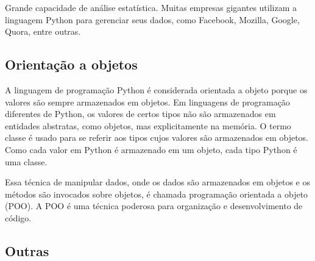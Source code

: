         Grande capacidade de análise estatística. Muitas empresas gigantes utilizam a linguagem Python para gerenciar seus dados, como Facebook, Mozilla, Google, Quora, entre outras. 

        \subsection{Orientação a objetos}
        A linguagem de programação Python é considerada orientada a objeto porque os valores são
        sempre armazenados em objetos. Em linguagens de programação diferentes de Python, os valores
        de certos tipos não são armazenados em entidades abstratas, como objetos, mas explicitamente na
        memória. O termo classe é usado para se referir aos tipos cujos valores são armazenados em
        objetos. Como cada valor em Python é armazenado em um objeto, cada tipo Python é uma classe. 
        
        Essa técnica de manipular dados, onde os dados são armazenados em objetos e os métodos são invocados sobre objetos, é chamada programação
        orientada a objeto (POO). A POO é uma técnica poderosa para organização e desenvolvimento
        de código. 

        \subsection{Outras} 